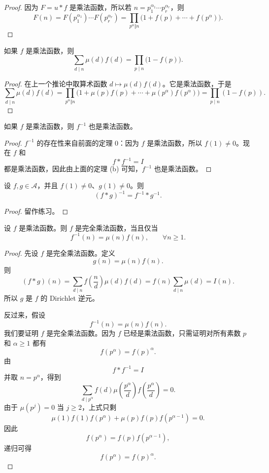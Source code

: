 \begin{proof}
	因为 $F=u*f$ 是乘法函数，所以若 $n=p_1^{\alpha_1}\cdots p_r^{\alpha_r}$，则
	\[
		F(n)
		=
		F(p_1^{\alpha_1})\cdots F(p_r^{\alpha_r})
		=
		\prod_{p^\alpha\Vert n}\bigl(1+f(p)+\cdots+f(p^\alpha)\bigr).
	\]
\end{proof}

\begin{corollary}
	如果 $f$ 是乘法函数，则
	\[
		\sum_{d\mid n}\mu(d)f(d)
		=
		\prod_{p\mid n}\bigl(1-f(p)\bigr).
	\]
\end{corollary}

\begin{proof}
	在上一个推论中取算术函数 $d\mapsto \mu(d)f(d)$。它是乘法函数，于是
	\[
		\sum_{d\mid n}\mu(d)f(d)
		=
		\prod_{p^\alpha\Vert n}
		\bigl(1+\mu(p)f(p)+\cdots+\mu(p^\alpha)f(p^\alpha)\bigr)
		=
		\prod_{p\mid n}(1-f(p)).
	\]
\end{proof}

\begin{corollary}
	如果 $f$ 是乘法函数，则 $f^{-1}$ 也是乘法函数。
\end{corollary}

\begin{proof}
	$f^{-1}$ 的存在性来自前面的定理 0：因为 $f$ 是乘法函数，所以 $f(1)\neq 0$。现在 $f$ 和
	\[
		f*f^{-1}=I
	\]
	都是乘法函数，因此由上面的定理 (b) 可知，$f^{-1}$ 也是乘法函数。
\end{proof}

\begin{theorem}
	设 $f,g\in\mathcal A$，并且 $f(1)\neq 0$、$g(1)\neq 0$。则
	\[
		(f*g)^{-1}=f^{-1}*g^{-1}.
	\]
\end{theorem}

\begin{proof}
	留作练习。
\end{proof}

\begin{theorem}
	设 $f$ 是乘法函数。则 $f$ 是完全乘法函数，当且仅当
	\[
		f^{-1}(n)=\mu(n)f(n),\qquad \forall n\geq 1.
	\]
\end{theorem}

\begin{proof}
	先设 $f$ 是完全乘法函数。定义
	\[
		g(n)=\mu(n)f(n).
	\]
	则
	\[
		(f*g)(n)
		=
		\sum_{d\mid n}f\left(\frac nd\right)\mu(d)f(d)
		=
		f(n)\sum_{d\mid n}\mu(d)
		=
		I(n).
	\]
	所以 $g$ 是 $f$ 的 Dirichlet 逆元。

	反过来，假设
	\[
		f^{-1}(n)=\mu(n)f(n).
	\]
	我们要证明 $f$ 是完全乘法函数。因为 $f$ 已经是乘法函数，只需证明对所有素数 $p$ 和 $\alpha\geq 1$ 都有
	\[
		f(p^\alpha)=f(p)^\alpha.
	\]
	由
	\[
		f*f^{-1}=I
	\]
	并取 $n=p^\alpha$，得到
	\[
		\sum_{d\mid p^\alpha}
		f(d)\mu\left(\frac{p^\alpha}{d}\right)f\left(\frac{p^\alpha}{d}\right)
		=0.
	\]
	由于 $\mu(p^j)=0$ 当 $j\geq 2$，上式只剩
	\[
		\mu(1)f(1)f(p^\alpha)+\mu(p)f(p)f(p^{\alpha-1})=0.
	\]
	因此
	\[
		f(p^\alpha)=f(p)f(p^{\alpha-1}),
	\]
	递归可得
	\[
		f(p^\alpha)=f(p)^\alpha.
	\]
\end{proof}

